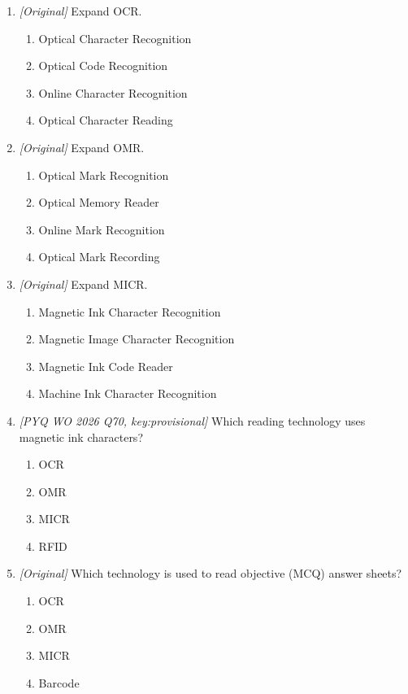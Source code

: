 \begin{enumerate}[label=\textbf{Q\arabic*.}, leftmargin=*]
\item \textit{[Original]} Expand OCR.
  \begin{enumerate}[label=\Alph*.]
    \item Optical Character Recognition
    \item Optical Code Recognition
    \item Online Character Recognition
    \item Optical Character Reading
  \end{enumerate}
\item \textit{[Original]} Expand OMR.
  \begin{enumerate}[label=\Alph*.]
    \item Optical Mark Recognition
    \item Optical Memory Reader
    \item Online Mark Recognition
    \item Optical Mark Recording
  \end{enumerate}
\item \textit{[Original]} Expand MICR.
  \begin{enumerate}[label=\Alph*.]
    \item Magnetic Ink Character Recognition
    \item Magnetic Image Character Recognition
    \item Magnetic Ink Code Reader
    \item Machine Ink Character Recognition
  \end{enumerate}
\item \textit{[PYQ WO 2026 Q70, key:provisional]} Which reading technology
  uses magnetic ink characters?
  \begin{enumerate}[label=\Alph*.]
    \item OCR
    \item OMR
    \item MICR
    \item RFID
  \end{enumerate}
\item \textit{[Original]} Which technology is used to read objective (MCQ)
  answer sheets?
  \begin{enumerate}[label=\Alph*.]
    \item OCR
    \item OMR
    \item MICR
    \item Barcode
  \end{enumerate}

\end{enumerate}
